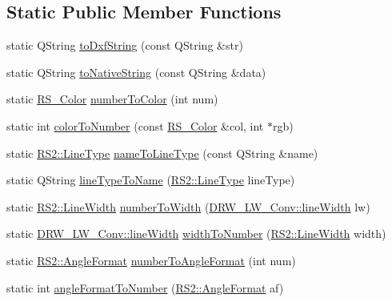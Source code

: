 \subsection*{Static Public Member Functions}
\begin{DoxyCompactItemize}
\item 
static Q\-String \hyperlink{classRS__FilterDXFRW_aebbe77ecb80ccc4aac62fd72633a897e}{to\-Dxf\-String} (const Q\-String \&str)
\item 
static Q\-String \hyperlink{classRS__FilterDXFRW_a8c2a8998f69452594821185bfd8900e2}{to\-Native\-String} (const Q\-String \&data)
\item 
static \hyperlink{classRS__Color}{R\-S\-\_\-\-Color} \hyperlink{classRS__FilterDXFRW_a568a0e1280a799421977ea4445e12018}{number\-To\-Color} (int num)
\item 
static int \hyperlink{classRS__FilterDXFRW_a1b9d26332cb4a3119a3cd2c369ea1b0e}{color\-To\-Number} (const \hyperlink{classRS__Color}{R\-S\-\_\-\-Color} \&col, int $\ast$rgb)
\item 
static \hyperlink{classRS2_a6f3a82972c2d62456f6cacb74e14c95f}{R\-S2\-::\-Line\-Type} \hyperlink{classRS__FilterDXFRW_a1865dbe1aa4f8f3c1060ef4c3b6a1bf1}{name\-To\-Line\-Type} (const Q\-String \&name)
\item 
static Q\-String \hyperlink{classRS__FilterDXFRW_a85840cb3adb35aef42524af78f2ecc0a}{line\-Type\-To\-Name} (\hyperlink{classRS2_a6f3a82972c2d62456f6cacb74e14c95f}{R\-S2\-::\-Line\-Type} line\-Type)
\item 
static \hyperlink{classRS2_a023485c482c5ee9e36b3dfad781adf29}{R\-S2\-::\-Line\-Width} \hyperlink{classRS__FilterDXFRW_a0c2d51db6e2b04444bac4267821b5401}{number\-To\-Width} (\hyperlink{classDRW__LW__Conv_aed68cbc3d8bdf7e20003dd2d970279b3}{D\-R\-W\-\_\-\-L\-W\-\_\-\-Conv\-::line\-Width} lw)
\item 
static \hyperlink{classDRW__LW__Conv_aed68cbc3d8bdf7e20003dd2d970279b3}{D\-R\-W\-\_\-\-L\-W\-\_\-\-Conv\-::line\-Width} \hyperlink{classRS__FilterDXFRW_a04c61bf53241d5ef044c07af071dd0f2}{width\-To\-Number} (\hyperlink{classRS2_a023485c482c5ee9e36b3dfad781adf29}{R\-S2\-::\-Line\-Width} width)
\item 
static \hyperlink{classRS2_a9c7a07b03f910b04154536a28c151277}{R\-S2\-::\-Angle\-Format} \hyperlink{classRS__FilterDXFRW_a15786150ebd889bb799831d528984549}{number\-To\-Angle\-Format} (int num)
\item 
static int \hyperlink{classRS__FilterDXFRW_af6e4552f755d760aa83676c0e9c4dcd7}{angle\-Format\-To\-Number} (\hyperlink{classRS2_a9c7a07b03f910b04154536a28c151277}{R\-S2\-::\-Angle\-Format} af)

\end{DoxyCompactItemize}
